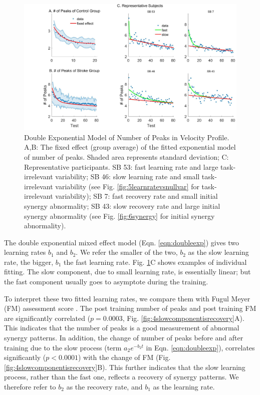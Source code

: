 \begin{figure}
	\centering
	\includegraphics[width=1\linewidth]{figures/3nopFixRan}
	\caption[Double Exponential Model]
	{Double Exponential Model of Number of Peaks in Velocity Profile. 
		A,B: The fixed effect (group average) of the fitted exponential model of number of peaks. 
		Shaded area represents standard deviation;
		C: Representative participants.
		SB 53: fast learning rate and large task-irrelevant variability; 
		SB 46: slow learning rate and small task-irrelevant variability (see Fig. \ref{fig:5learnratevsnullvar} for task-irrelevant variability);
		SB 7: fast recovery rate and small initial synergy abnormality;
		SB 43: slow recovery rate and large initial synergy abnormality (see Fig. \ref{fig:6synergy} for initial synergy abnormality).
	}
	\label{fig:3nopfixran}
\end{figure}


The double exponential mixed effect model (Eqn. \ref{eqn:doubleexp}) gives two learning rates $ b_1 $ and $ b_2 $. 
We refer the smaller of the two, $ b_2 $ as the slow learning rate, the bigger, $ b_1 $ the fast learning rate.
Fig. \ref{fig:3nopfixran}C shows examples of individual fitting.
The slow component, due to small learning rate, is essentially linear; but the fast component usually goes to asymptote during the training.

To interpret these two fitted learning rates, we compare them with Fugul Meyer (FM) assessment score \cite{}.
The post training number of peaks and post training FM are significantly correlated ($ p = 0.0003 $, Fig. \ref{fig:4slowcomponentisrecovery}A).
This indicates that the number of peaks is a good measurement of abnormal synergy patterns.
In addition, the change of number of peaks before and after training due to the slow process (term $ a_2e^{-b_2t} $ in Eqn. \ref{eqn:doubleexp}), correlates significantly ($ p<0.0001 $) with the change of FM (Fig. \ref{fig:4slowcomponentisrecovery}B).
This further indicates that the slow learning process, rather than the fast one, reflects a recovery of synergy patterns.
We therefore refer to $ b_2 $ as the recovery rate, and $ b_1 $ as the learning rate.


